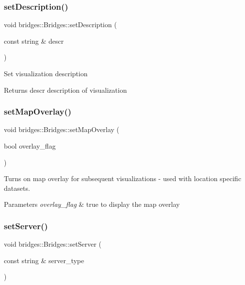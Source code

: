 \subsubsection{\texorpdfstring{set\+Description()}{setDescription()}}
{\footnotesize\ttfamily void bridges\+::\+Bridges\+::set\+Description (\begin{DoxyParamCaption}\item[{const string \&}]{descr }\end{DoxyParamCaption})\hspace{0.3cm}{\ttfamily [inline]}}

Set visualization description \begin{DoxyReturn}{Returns}
descr description of visualization 
\end{DoxyReturn}
\mbox{\label{classbridges_1_1_bridges_a221442c674b625a403486076cf8a7c03}} 
\subsubsection{\texorpdfstring{set\+Map\+Overlay()}{setMapOverlay()}}
{\footnotesize\ttfamily void bridges\+::\+Bridges\+::set\+Map\+Overlay (\begin{DoxyParamCaption}\item[{bool}]{overlay\+\_\+flag }\end{DoxyParamCaption})\hspace{0.3cm}{\ttfamily [inline]}}



Turns on map overlay for subsequent visualizations -\/ used with location specific datasets. 


\begin{DoxyParams}{Parameters}
{\em overlay\+\_\+flag} & true to display the map overlay \\
\hline
\end{DoxyParams}
\mbox{\label{classbridges_1_1_bridges_afa05302cf91c91b902aef693525107a5}} 
\subsubsection{\texorpdfstring{set\+Server()}{setServer()}}
{\footnotesize\ttfamily void bridges\+::\+Bridges\+::set\+Server (\begin{DoxyParamCaption}\item[{const string \&}]{server\+\_\+type }\end{DoxyParamCaption})\hspace{0.3cm}{\ttfamily [inline]}}

